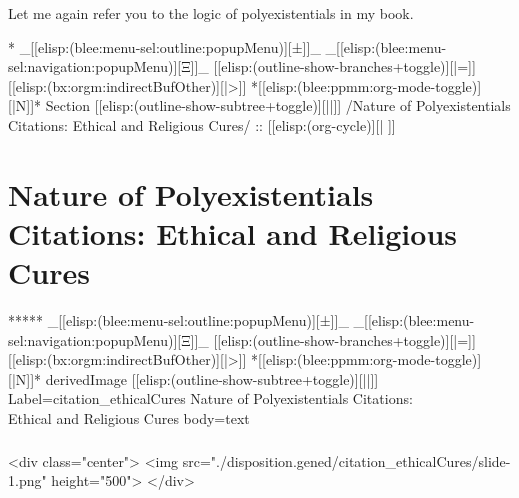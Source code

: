 \begin{whenOrg}
\begin{verblatex}
\begin{frame}[fragile,plain,label=ayatollahMotahari]
{  Let me again refer you to the logic of polyexistentials in my book.

}
\end{frame}
\end{verblatex}



\begin{whenOrg}
*  _[[elisp:(blee:menu-sel:outline:popupMenu)][±]]_ _[[elisp:(blee:menu-sel:navigation:popupMenu)][Ξ]]_ [[elisp:(outline-show-branches+toggle)][|=]] [[elisp:(bx:orgm:indirectBufOther)][|>]] *[[elisp:(blee:ppmm:org-mode-toggle)][|N]]*  Section    [[elisp:(outline-show-subtree+toggle)][||]]   /Nature of Polyexistentials Citations: Ethical and Religious Cures/ ::  [[elisp:(org-cycle)][| ]]
\end{whenOrg}

\section{Nature of Polyexistentials Citations: Ethical and Religious Cures}


\begin{whenOrg}
*****  _[[elisp:(blee:menu-sel:outline:popupMenu)][±]]_ _[[elisp:(blee:menu-sel:navigation:popupMenu)][Ξ]]_ [[elisp:(outline-show-branches+toggle)][|=]] [[elisp:(bx:orgm:indirectBufOther)][|>]] *[[elisp:(blee:ppmm:org-mode-toggle)][|N]]*  derivedImage [[elisp:(outline-show-subtree+toggle)][||]] Label=citation_ethicalCures Nature of Polyexistentials Citations:\\ Ethical and Religious Cures body=text
\end{whenOrg}

\begin{htmlonly}

\begin{frame}[fragile,plain,label=citation_ethicalCures]
    \frametitle{}
    \framesubtitle{}
    \begin{rawhtml}
<div class="center">
<img src="./disposition.gened/citation_ethicalCures/slide-1.png" height="500">
</div>
    \end{rawhtml}
\end{frame}
\end{htmlonly}


\end{whenOrg}
